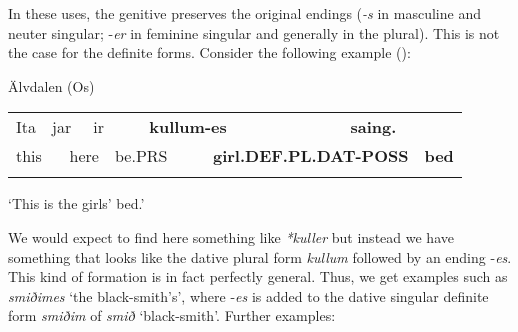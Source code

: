 In these uses, the genitive preserves the original endings (\textit{\nobreakdash-s }in masculine and neuter singular; \nobreakdash-\textit{er} in feminine singular and generally in the plural). This is not the case for the definite forms. Consider the following example (\citet[96]{Levander1909}):


\begin{listWWNumileveli}
\item 

\begin{styleExample}
Älvdalen (Os)

\end{styleExample}

\end{listWWNumileveli}

\begin{tabular}{llllllllll}
\lsptoprule
Ita & \multicolumn{2}{l}{jar

} & \multicolumn{2}{l}{ir

} & \multicolumn{2}{l}{{\bfseries kullum-es}

} & \multicolumn{2}{l}{{\bfseries saing.}

} & \\
\multicolumn{2}{l}{this

} & \multicolumn{2}{l}{here

} & \multicolumn{2}{l}{be.PRS

} & \multicolumn{2}{l}{{\bfseries girl.DEF.PL.DAT-POSS}

} & \multicolumn{2}{l}{{\bfseries bed}

}\\
\lspbottomrule
\end{tabular}

\begin{styleTranslation}
‘This is the girls’ bed.’

\end{styleTranslation}

\begin{styleBodyTextFirst}
We would expect to find here something like \textit{*kuller }but instead\textit{ }we have something that looks like the dative plural form \textit{kullum} followed by an ending \nobreakdash-\textit{es}. This kind of formation is in fact perfectly general. Thus, we get examples such as \textit{smiðimes} ‘the black-smith’s’, where \nobreakdash-\textit{es }is added to the dative singular definite form \textit{smiðim} of \textit{smið} ‘black-smith’. Further examples:

\end{styleBodyTextFirst}

